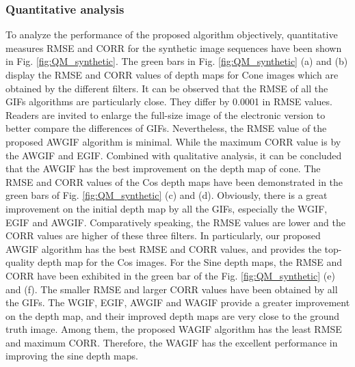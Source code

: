 \documentclass[a4paper,fleqn]{cas-dc}
\begin{document}
\subsubsection{Quantitative analysis}\label{Quantitative}
To analyze the performance of the proposed algorithm objectively, quantitative measures RMSE and CORR for the synthetic image sequences have been shown in Fig. \ref{fig:QM_synthetic}. The green bars in Fig. \ref{fig:QM_synthetic} (a) and (b) display the RMSE and CORR values of depth maps for Cone images which are obtained by the different filters. It can be observed that the RMSE of all the GIFs algorithms are particularly close. They differ by 0.0001 in RMSE values. Readers are invited to enlarge the full-size image of the electronic version to better compare the differences of GIFs. Nevertheless, the RMSE value of the proposed AWGIF algorithm is minimal. While the maximum CORR value is by the AWGIF and EGIF. Combined with qualitative analysis, it can be concluded that the AWGIF has the best improvement on the depth map of cone. The RMSE and CORR values of the Cos depth maps have been demonstrated in the green bars of Fig. \ref{fig:QM_synthetic} (c) and (d). Obviously, there is a great improvement on the initial depth map by all the GIFs, especially the WGIF, EGIF and AWGIF. Comparatively speaking, the RMSE values are lower and the CORR values are higher of these three filters. In particularly, our proposed AWGIF algorithm has the best RMSE and CORR values, and provides the top-quality depth map for the Cos images. For the Sine depth maps, the RMSE and CORR have been exhibited in the green bar of the Fig. \ref{fig:QM_synthetic} (e) and (f). The smaller RMSE and larger CORR values have been obtained by all the GIFs. The WGIF, EGIF, AWGIF and WAGIF provide a greater improvement on the depth map, and their improved depth maps are very close to the ground truth image. Among them, the proposed WAGIF algorithm has the least RMSE and maximum CORR. Therefore, the WAGIF has the excellent performance in improving the sine depth maps.
\end{document}
